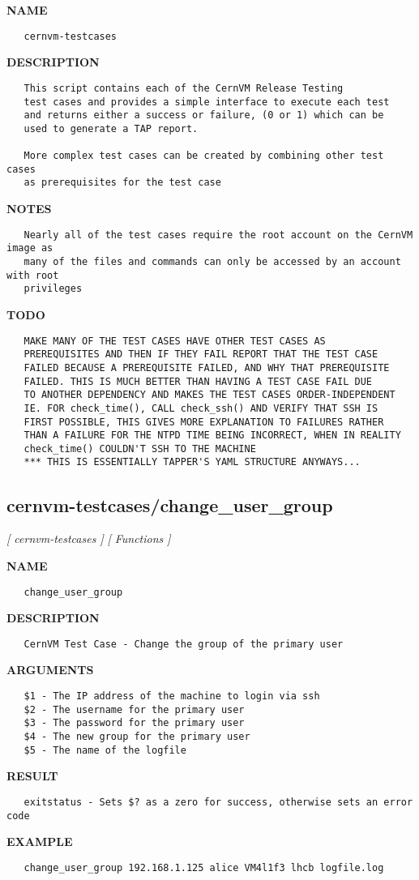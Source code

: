 \label{ch:robo41}
\label{ch:test_suite_cernvm_testcases}
\textbf{NAME}
\begin{verbatim}
   cernvm-testcases
\end{verbatim}
\textbf{DESCRIPTION}
\begin{verbatim}
   This script contains each of the CernVM Release Testing
   test cases and provides a simple interface to execute each test
   and returns either a success or failure, (0 or 1) which can be 
   used to generate a TAP report.

   More complex test cases can be created by combining other test cases
   as prerequisites for the test case
\end{verbatim}
\textbf{NOTES}
\begin{verbatim}
   Nearly all of the test cases require the root account on the CernVM image as 
   many of the files and commands can only be accessed by an account with root 
   privileges
\end{verbatim}
\textbf{TODO}
\begin{verbatim}
   MAKE MANY OF THE TEST CASES HAVE OTHER TEST CASES AS
   PREREQUISITES AND THEN IF THEY FAIL REPORT THAT THE TEST CASE
   FAILED BECAUSE A PREREQUISITE FAILED, AND WHY THAT PREREQUISITE
   FAILED. THIS IS MUCH BETTER THAN HAVING A TEST CASE FAIL DUE
   TO ANOTHER DEPENDENCY AND MAKES THE TEST CASES ORDER-INDEPENDENT
   IE. FOR check_time(), CALL check_ssh() AND VERIFY THAT SSH IS
   FIRST POSSIBLE, THIS GIVES MORE EXPLANATION TO FAILURES RATHER
   THAN A FAILURE FOR THE NTPD TIME BEING INCORRECT, WHEN IN REALITY
   check_time() COULDN'T SSH TO THE MACHINE
   *** THIS IS ESSENTIALLY TAPPER'S YAML STRUCTURE ANYWAYS...
\end{verbatim}
\newpage
\subsection{cernvm-testcases/change\_user\_group}
\textsl{[ cernvm-testcases ]}
\textsl{[ Functions ]}

\label{ch:robo16}
\label{ch:cernvm_testcases_change_user_group}
\textbf{NAME}
\begin{verbatim}
   change_user_group
\end{verbatim}
\textbf{DESCRIPTION}
\begin{verbatim}
   CernVM Test Case - Change the group of the primary user
\end{verbatim}
\textbf{ARGUMENTS}
\begin{verbatim}
   $1 - The IP address of the machine to login via ssh
   $2 - The username for the primary user
   $3 - The password for the primary user
   $4 - The new group for the primary user
   $5 - The name of the logfile
\end{verbatim}
\textbf{RESULT}
\begin{verbatim}
   exitstatus - Sets $? as a zero for success, otherwise sets an error code
\end{verbatim}
\textbf{EXAMPLE}
\begin{verbatim}
   change_user_group 192.168.1.125 alice VM4l1f3 lhcb logfile.log
\end{verbatim}
\newpage
